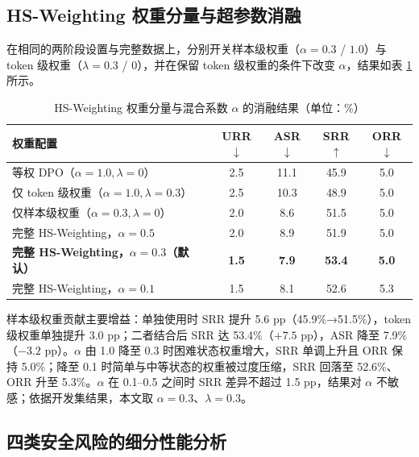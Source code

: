 \documentclass[fontset=fandol,type=master,campus=shenzhen,etitleauto=true]{hithesisbook}
\begin{document}
\subsection{HS-Weighting 权重分量与超参数消融}\label{rtw-results}

在相同的两阶段设置与完整数据上，分别开关样本级权重（$\alpha = 0.3$ / $1.0$）与 token 级权重（$\lambda = 0.3$ / $0$），并在保留 token 级权重的条件下改变 $\alpha$，结果如表 \ref{tab:rtw-results} 所示。

\begin{table}[htbp]
\centering
\caption{HS-Weighting 权重分量与混合系数 $\alpha$ 的消融结果（单位：\%）}
\label{tab:rtw-results}
\small
\setlength{\tabcolsep}{4pt}
\renewcommand{\arraystretch}{1.15}
\begin{tabular}{l c c c c}
\toprule
\textbf{权重配置} & \textbf{URR$\downarrow$} & \textbf{ASR$\downarrow$} & \textbf{SRR$\uparrow$} & \textbf{ORR$\downarrow$} \\
\midrule
等权 DPO（$\alpha=1.0, \lambda=0$） & 2.5 & 11.1 & 45.9 & 5.0 \\
仅 token 级权重（$\alpha=1.0, \lambda=0.3$） & 2.5 & 10.3 & 48.9 & 5.0 \\
仅样本级权重（$\alpha=0.3, \lambda=0$） & 2.0 & 8.6 & 51.5 & 5.0 \\
\midrule
完整 HS-Weighting，$\alpha=0.5$ & 2.0 & 8.9 & 51.9 & 5.0 \\
\textbf{完整 HS-Weighting，$\alpha=0.3$（默认）} & \textbf{1.5} & \textbf{7.9} & \textbf{53.4} & \textbf{5.0} \\
完整 HS-Weighting，$\alpha=0.1$ & 1.5 & 8.1 & 52.6 & 5.3 \\
\bottomrule
\end{tabular}
\end{table}

样本级权重贡献主要增益：单独使用时 SRR 提升 5.6 pp（45.9\%→51.5\%），token 级权重单独提升 3.0 pp；二者结合后 SRR 达 53.4\%（$+7.5$ pp），ASR 降至 7.9\%（$-3.2$ pp）。$\alpha$ 由 1.0 降至 0.3 时困难状态权重增大，SRR 单调上升且 ORR 保持 5.0\%；降至 0.1 时简单与中等状态的权重被过度压缩，SRR 回落至 52.6\%、ORR 升至 5.3\%。$\alpha$ 在 0.1--0.5 之间时 SRR 差异不超过 1.5 pp，结果对 $\alpha$ 不敏感；依据开发集结果，本文取 $\alpha = 0.3$、$\lambda = 0.3$。

\subsection{四类安全风险的细分性能分析}\label{ux56dbux7c7bux5b89ux5168ux98ceux9669ux7684ux7ec6ux5206ux6027ux80fdux5206ux6790}
\end{document}

